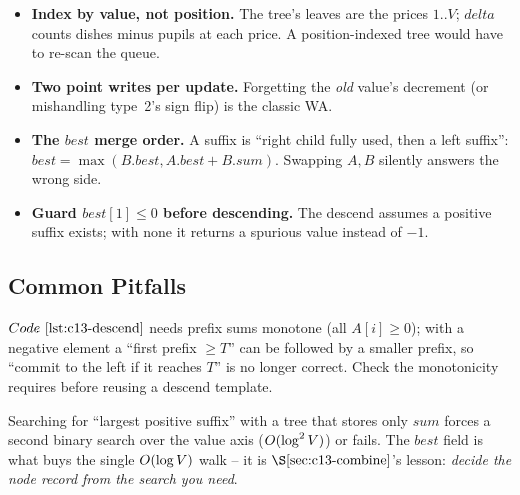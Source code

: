 \begin{hardeningbox}
\begin{itemize}[nosep,leftmargin=1.4em]
  \item \textbf{Index by value, not position.}  The tree's leaves are the prices
        \(1..V\); \(\mathit{delta}\) counts dishes minus pupils at each price.
        A position-indexed tree would have to re-scan the queue.
  \item \textbf{Two point writes per update.}  Forgetting the \emph{old} value's
        decrement (or mishandling type~2's sign flip) is the classic WA.
  \item \textbf{The \(\mathit{best}\) merge order.}  A suffix is ``right child
        fully used, then a left suffix'': \(\mathit{best}=\max(B.\mathit{best},
        A.\mathit{best}+B.\mathit{sum})\).  Swapping \(A,B\) silently answers the
        wrong side.
  \item \textbf{Guard \(\mathit{best}[1]\le0\) before descending.}  The descend
        assumes a positive suffix exists; with none it returns a spurious value
        instead of \(-1\).
\end{itemize}
\end{hardeningbox}

\subsection{Common Pitfalls}

\begin{warningbox}
\(\coderef{c13-descend}\) needs prefix sums monotone (all \(A[i]\ge0\)); with a
negative element a ``first prefix \(\ge T\)'' can be followed by a smaller prefix,
so ``commit to the left if it reaches \(T\)'' is no longer correct.  Check the
monotonicity  requires before reusing a descend template.
\end{warningbox}

\begin{warningbox}
Searching for ``largest positive suffix'' with a tree that stores only \(\mathit{sum}\)
forces a second binary search over the value axis (\(O(\log^2 V)\)) or fails.
The \(\mathit{best}\) field is what buys the single \(O(\log V)\) walk -- it is
\(\secref{c13-combine}\)'s lesson: \emph{decide the node record from the search you
need}.
\end{warningbox}

